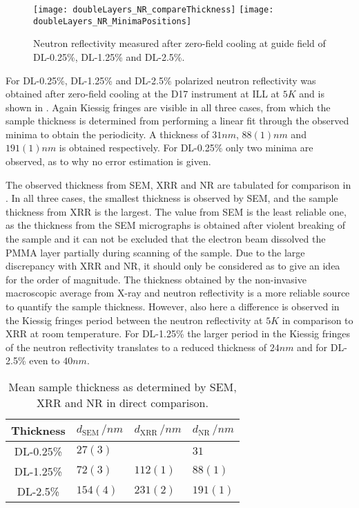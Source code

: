\documentclass[\main/dresen_thesis.tex]{subfiles}
\begin{document}
  \begin{figure}[tb]
    \centering
    \texttt{[image: doubleLayers\_NR\_compareThickness]}
    \texttt{[image: doubleLayers\_NR\_MinimaPositions]}
    \caption{\label{fig:doublelayers:nr:thickness}Neutron reflectivity measured after zero-field cooling at guide field of DL-0.25\%, DL-1.25\% and DL-2.5\%.}
  \end{figure}

  For DL-0.25\%, DL-1.25\% and DL-2.5\% polarized neutron reflectivity was obtained after zero-field cooling at the D17 instrument at ILL at $5 \unit{K}$ and is shown in .
  Again Kiessig fringes are visible in all three cases, from which the sample thickness is determined from performing a linear fit through the observed minima to obtain the periodicity.
  A thickness of $31 \unit{nm}$, $88(1) \unit{nm}$ and $191(1) \unit{nm}$ is obtained respectively.
  For DL-0.25\% only two minima are observed, as to why no error estimation is given.

  The observed thickness from SEM, XRR and NR are tabulated for comparison in .
  In all three cases, the smallest thickness is observed by SEM, and the sample thickness from XRR is the largest.
  The value from SEM is the least reliable one, as the thickness from the SEM micrographs is obtained after violent breaking of the sample and it can not be excluded that the electron beam dissolved the PMMA layer partially during scanning of the sample.
  Due to the large discrepancy with XRR and NR, it should only be considered as to give an idea for the order of magnitude.
  The thickness obtained by the non-invasive macroscopic average from X-ray and neutron reflectivity is a more reliable source to quantify the sample thickness.
  However, also here a difference is observed in the Kiessig fringes period between the neutron reflectivity at $5 \unit{K}$ in comparison to XRR at room temperature.
  For DL-1.25\% the larger period in the Kiessig fringes of the neutron reflectivity translates to a reduced thickness of $24 \unit{nm}$ and for DL-2.5\% even to $40 \unit{nm}$.

  \begin{table}[!htbp]
    \centering
    \caption{\label{tab:doublelayers:ThicknessComparison}Mean sample thickness as determined by SEM, XRR and NR in direct comparison.}
    \begin{tabular}{ c | l | l | l }
      \rule{0pt}{2ex} \textbf{Thickness}  & $d_\mathrm{SEM} \, / \unit{nm}$ & $d_\mathrm{XRR} \, / \unit{nm}$& $d_\mathrm{NR} \, / \unit{nm}$ \\
      \hline
      DL-0.25\%  & $27(3)$  &           & $31$\\
      DL-1.25\%  & $72(3)$  & $112(1)$  & $88(1)$\\
      DL-2.5\%   & $154(4)$ & $231(2)$  & $191(1)$\\
      \hline
    \end{tabular}
  \end{table}
\end{document}
